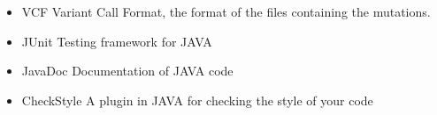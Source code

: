 \begin{itemize}
	\item VCF
		\subitem Variant Call Format, the format of the files containing the mutations.
	\item JUnit
		\subitem Testing framework for JAVA
	\item JavaDoc
		\subitem Documentation of JAVA code
	\item CheckStyle
		\subitem A plugin in JAVA for checking the style of your code
\end{itemize}